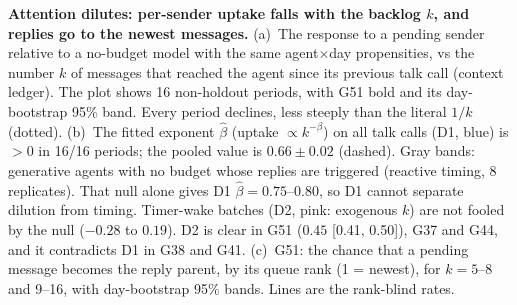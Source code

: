 \caption{\textbf{Attention dilutes: per-sender uptake falls with the backlog $k$, and replies go to the newest messages.}
(a)~The response to a pending sender relative to a no-budget model with the same agent$\times$day propensities, vs the number $k$ of messages that reached the agent since its previous talk call (context ledger). The plot shows 16 non-holdout periods, with G51 bold and its day-bootstrap 95\% band. Every period declines, less steeply than the literal $1/k$ (dotted).
(b)~The fitted exponent $\hat\beta$ (uptake $\propto k^{-\beta}$) on all talk calls (D1, blue) is $>0$ in 16/16 periods; the pooled value is $0.66\pm0.02$ (dashed). Gray bands: generative agents with no budget whose replies are triggered (reactive timing, 8 replicates). That null alone gives D1 $\hat\beta=0.75$--$0.80$, so D1 cannot separate dilution from timing. Timer-wake batches (D2, pink: exogenous $k$) are not fooled by the null ($-0.28$ to $0.19$). D2 is clear in G51 ($0.45$ [0.41, 0.50]), G37 and G44, and it contradicts D1 in G38 and G41.
(c)~G51: the chance that a pending message becomes the reply parent, by its queue rank (1 = newest), for $k=5$--8 and 9--16, with day-bootstrap 95\% bands. Lines are the rank-blind rates.}
\label{fig:H18}

